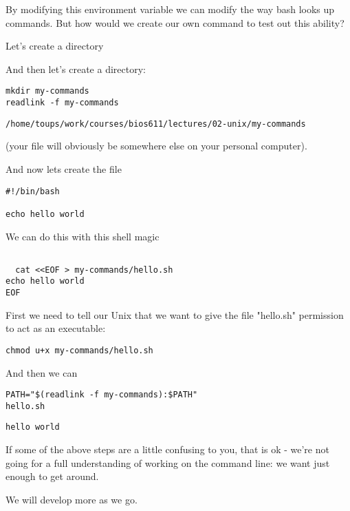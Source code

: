 \documentclass[11pt]{article}
\begin{document}
By modifying this environment variable we can modify the way bash
looks up commands. But how would we create our own command to test out
this ability?

Let's create a directory

And then let's create a directory:

\begin{verbatim}
mkdir my-commands
readlink -f my-commands
\end{verbatim}

\begin{verbatim}
/home/toups/work/courses/bios611/lectures/02-unix/my-commands
\end{verbatim}

(your file will obviously be somewhere else on your personal computer).

And now lets create the file

\begin{verbatim}
#!/bin/bash

echo hello world

\end{verbatim}

We can do this with this shell magic

\begin{verbatim}

  cat <<EOF > my-commands/hello.sh
echo hello world
EOF

\end{verbatim}

First we need to tell our Unix that we want to give the file
"hello.sh" permission to act as an executable:

\begin{verbatim}
chmod u+x my-commands/hello.sh
\end{verbatim}

And then we can 

\begin{verbatim}
PATH="$(readlink -f my-commands):$PATH"
hello.sh
\end{verbatim}

\begin{verbatim}
hello world
\end{verbatim}

If some of the above steps are a little confusing to you, that is ok -
we're not going for a full understanding of working on the command
line: we want just enough to get around.

We will develop more as we go.
\end{document}
